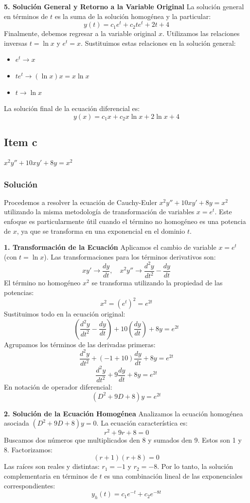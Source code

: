 \documentclass[a4paper]{article}
\begin{document}
\textbf{5. Solución General y Retorno a la Variable Original}
La solución general en términos de $t$ es la suma de la solución homogénea y la particular:
$$
y(t) = c_1 e^{t} + c_2 t e^{t} + 2t + 4
$$
Finalmente, debemos regresar a la variable original $x$. Utilizamos las relaciones inversas $t = \ln x$ y $e^t = x$. Sustituimos estas relaciones en la solución general:
\begin{itemize}
    \item $e^t \rightarrow x$
    \item $t e^t \rightarrow (\ln x) x = x \ln x$
    \item $t \rightarrow \ln x$
\end{itemize}
La solución final de la ecuación diferencial es:
$$
y(x) = c_1 x + c_2 x \ln x + 2 \ln x + 4
$$

\subsection{Item c}
$x^2y'' + 10xy' + 8y = x^2$

\subsubsection{Solución}
Procedemos a resolver la ecuación de Cauchy-Euler $x^2y'' + 10xy' + 8y = x^2$ utilizando la misma metodología de transformación de variables $x = e^t$. Este enfoque es particularmente útil cuando el término no homogéneo es una potencia de $x$, ya que se transforma en una exponencial en el dominio $t$.

\textbf{1. Transformación de la Ecuación}
Aplicamos el cambio de variable $x = e^t$ (con $t = \ln x$). Las transformaciones para los términos derivativos son:
$$
x y' \rightarrow \frac{dy}{dt}, \quad x^2 y'' \rightarrow \frac{d^2y}{dt^2} - \frac{dy}{dt}
$$
El término no homogéneo $x^2$ se transforma utilizando la propiedad de las potencias:
$$
x^2 = (e^t)^2 = e^{2t}
$$
Sustituimos todo en la ecuación original:
$$
\left( \frac{d^2y}{dt^2} - \frac{dy}{dt} \right) + 10\left( \frac{dy}{dt} \right) + 8y = e^{2t}
$$
Agrupamos los términos de las derivadas primeras:
$$
\frac{d^2y}{dt^2} + (-1 + 10)\frac{dy}{dt} + 8y = e^{2t}
$$
$$
\frac{d^2y}{dt^2} + 9\frac{dy}{dt} + 8y = e^{2t}
$$
En notación de operador diferencial:
$$
(D^2 + 9D + 8)y = e^{2t}
$$

\textbf{2. Solución de la Ecuación Homogénea}
Analizamos la ecuación homogénea asociada $(D^2 + 9D + 8)y = 0$. La ecuación característica es:
$$
r^2 + 9r + 8 = 0
$$
Buscamos dos números que multiplicados den 8 y sumados den 9. Estos son 1 y 8. Factorizamos:
$$
(r + 1)(r + 8) = 0
$$
Las raíces son reales y distintas: $r_1 = -1$ y $r_2 = -8$. Por lo tanto, la solución complementaria en términos de $t$ es una combinación lineal de las exponenciales correspondientes:
$$
y_h(t) = c_1 e^{-t} + c_2 e^{-8t}
$$
\end{document}
